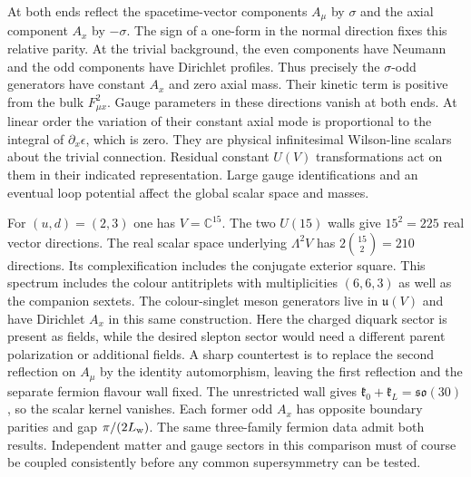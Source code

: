 \documentclass[aps,prd,reprint,onecolumn,nofootinbib,amsmath,amssymb]{revtex4-2}
\begin{document}
At both ends reflect the spacetime-vector components $A_\mu$ by $\sigma$ and the axial component $A_x$ by $-\sigma$. The sign of a one-form in the normal direction fixes this relative parity. At the trivial background, the even components have Neumann and the odd components have Dirichlet profiles. Thus precisely the $\sigma$-odd generators have constant $A_x$ and zero axial mass. Their kinetic term is positive from the bulk $F_{\mu x}^2$. Gauge parameters in these directions vanish at both ends. At linear order the variation of their constant axial mode is proportional to the integral of $\partial_x\epsilon$, which is zero. They are physical infinitesimal Wilson-line scalars about the trivial connection. Residual constant $U(V)$ transformations act on them in their indicated representation. Large gauge identifications and an eventual loop potential affect the global scalar space and masses.

For $(u,d)=(2,3)$ one has $V=\mathbb C^{15}$. The two $U(15)$ walls give $15^2=225$ real vector directions. The real scalar space underlying $\Lambda^2 V$ has $2\binom{15}{2}=210$ directions. Its complexification includes the conjugate exterior square. This spectrum includes the colour antitriplets with multiplicities $(6,6,3)$ as well as the companion sextets. The colour-singlet meson generators live in $\mathfrak u(V)$ and have Dirichlet $A_x$ in this same construction. Here the charged diquark sector is present as fields, while the desired slepton sector would need a different parent polarization or additional fields. A sharp countertest is to replace the second reflection on $A_\mu$ by the identity automorphism, leaving the first reflection and the separate fermion flavour wall fixed. The unrestricted wall gives $\mathfrak k_0+\mathfrak k_L=\mathfrak{so}(30)$, so the scalar kernel vanishes. Each former odd $A_x$ has opposite boundary parities and gap $\pi/(2L_{\rm w})$. The same three-family fermion data admit both results. Independent matter and gauge sectors in this comparison must of course be coupled consistently before any common supersymmetry can be tested.
\end{document}
